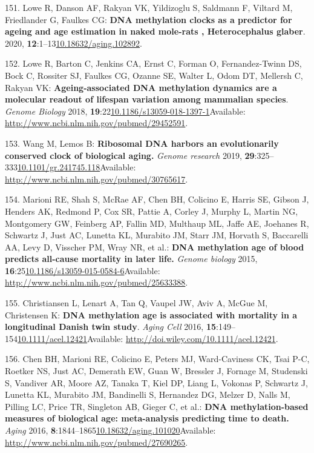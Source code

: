 \documentclass[
]{book}
\begin{document}
\leavevmode\hypertarget{ref-Lowe2020}{}%
151. Lowe R, Danson AF, Rakyan VK, Yildizoglu S, Saldmann F, Viltard M, Friedlander G, Faulkes CG: \textbf{DNA methylation clocks as a predictor for ageing and age estimation in naked mole-rats , Heterocephalus glaber}. 2020, \textbf{12}:1--13\href{https://doi.org/10.18632/aging.102892}{10.18632/aging.102892}.

\leavevmode\hypertarget{ref-Lowe2018}{}%
152. Lowe R, Barton C, Jenkins CA, Ernst C, Forman O, Fernandez-Twinn DS, Bock C, Rossiter SJ, Faulkes CG, Ozanne SE, Walter L, Odom DT, Mellersh C, Rakyan VK: \textbf{Ageing-associated DNA methylation dynamics are a molecular readout of lifespan variation among mammalian species}. \emph{Genome Biology} 2018, \textbf{19}:22\href{https://doi.org/10.1186/s13059-018-1397-1}{10.1186/s13059-018-1397-1}Available: \url{http://www.ncbi.nlm.nih.gov/pubmed/29452591}.

\leavevmode\hypertarget{ref-Wang2019}{}%
153. Wang M, Lemos B: \textbf{Ribosomal DNA harbors an evolutionarily conserved clock of biological aging.} \emph{Genome research} 2019, \textbf{29}:325--333\href{https://doi.org/10.1101/gr.241745.118}{10.1101/gr.241745.118}Available: \url{http://www.ncbi.nlm.nih.gov/pubmed/30765617}.

\leavevmode\hypertarget{ref-Marioni2015}{}%
154. Marioni RE, Shah S, McRae AF, Chen BH, Colicino E, Harris SE, Gibson J, Henders AK, Redmond P, Cox SR, Pattie A, Corley J, Murphy L, Martin NG, Montgomery GW, Feinberg AP, Fallin MD, Multhaup ML, Jaffe AE, Joehanes R, Schwartz J, Just AC, Lunetta KL, Murabito JM, Starr JM, Horvath S, Baccarelli AA, Levy D, Visscher PM, Wray NR, et al.: \textbf{DNA methylation age of blood predicts all-cause mortality in later life.} \emph{Genome biology} 2015, \textbf{16}:25\href{https://doi.org/10.1186/s13059-015-0584-6}{10.1186/s13059-015-0584-6}Available: \url{http://www.ncbi.nlm.nih.gov/pubmed/25633388}.

\leavevmode\hypertarget{ref-Christiansen2016}{}%
155. Christiansen L, Lenart A, Tan Q, Vaupel JW, Aviv A, McGue M, Christensen K: \textbf{DNA methylation age is associated with mortality in a longitudinal Danish twin study}. \emph{Aging Cell} 2016, \textbf{15}:149--154\href{https://doi.org/10.1111/acel.12421}{10.1111/acel.12421}Available: \url{http://doi.wiley.com/10.1111/acel.12421}.

\leavevmode\hypertarget{ref-Chen2016a}{}%
156. Chen BH, Marioni RE, Colicino E, Peters MJ, Ward-Caviness CK, Tsai P-C, Roetker NS, Just AC, Demerath EW, Guan W, Bressler J, Fornage M, Studenski S, Vandiver AR, Moore AZ, Tanaka T, Kiel DP, Liang L, Vokonas P, Schwartz J, Lunetta KL, Murabito JM, Bandinelli S, Hernandez DG, Melzer D, Nalls M, Pilling LC, Price TR, Singleton AB, Gieger C, et al.: \textbf{DNA methylation-based measures of biological age: meta-analysis predicting time to death.} \emph{Aging} 2016, \textbf{8}:1844--1865\href{https://doi.org/10.18632/aging.101020}{10.18632/aging.101020}Available: \url{http://www.ncbi.nlm.nih.gov/pubmed/27690265}.
\end{document}
